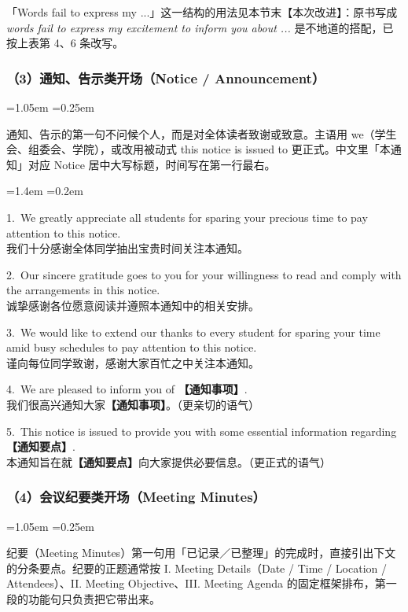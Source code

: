 \documentclass[11pt,a4paper]{ctexart}
\newcommand{\fillin}[1]{{\bfseries【#1】}}
\newcommand{\tip}[1]{\par\addvspace{3pt}\noindent{\bfseries【提示】}#1\par\addvspace{3pt}}
\newenvironment{note}{%
  \par\addvspace{5pt}%
  \begin{list}{}{\leftmargin=1.05em \rightmargin=0.25em \listparindent=0pt
    \itemindent=0pt \topsep=0pt \parsep=2pt \itemsep=2pt \partopsep=0pt}%
  \item\relax\small\color{ink}%
}{%
  \end{list}\addvspace{5pt}%
}
\newenvironment{eg}{%
  \par\addvspace{4pt}%
  \begin{list}{}{\leftmargin=1.4em \rightmargin=0.2em \listparindent=0pt
    \itemindent=0pt \topsep=0pt \parsep=2pt \itemsep=2pt \partopsep=0pt}%
  \item\relax
}{%
  \end{list}\addvspace{5pt}%
}
\begin{document}
\tip{「Words fail to express my ...」这一结构的用法见本节末【本次改进】：原书写成 \textit{words fail to express my excitement to inform you about ...} 是不地道的搭配，已按上表第 4、6 条改写。}

\subsubsection{（3）通知、告示类开场（Notice / Announcement）}

\begin{note}
通知、告示的第一句不问候个人，而是对全体读者致谢或致意。主语用 we（学生会、组委会、学院），或改用被动式 this notice is issued to 更正式。中文里「本通知」对应 Notice 居中大写标题，时间写在第一行最右。
\end{note}

\begin{eg}
1.\ We greatly appreciate all students for sparing your precious time to pay attention to this notice.\\
我们十分感谢全体同学抽出宝贵时间关注本通知。

2.\ Our sincere gratitude goes to you for your willingness to read and comply with the arrangements in this notice.\\
诚挚感谢各位愿意阅读并遵照本通知中的相关安排。

3.\ We would like to extend our thanks to every student for sparing your time amid busy schedules to pay attention to this notice.\\
谨向每位同学致谢，感谢大家百忙之中关注本通知。

4.\ We are pleased to inform you of \fillin{通知事项}.\\
我们很高兴通知大家\fillin{通知事项}。（更亲切的语气）

5.\ This notice is issued to provide you with some essential information regarding \fillin{通知要点}.\\
本通知旨在就\fillin{通知要点}向大家提供必要信息。（更正式的语气）
\end{eg}

\subsubsection{（4）会议纪要类开场（Meeting Minutes）}

\begin{note}
纪要（Meeting Minutes）第一句用「已记录／已整理」的完成时，直接引出下文的分条要点。纪要的正题通常按 I. Meeting Details（Date / Time / Location / Attendees）、II. Meeting Objective、III. Meeting Agenda 的固定框架排布，第一段的功能句只负责把它带出来。
\end{note}
\end{document}
